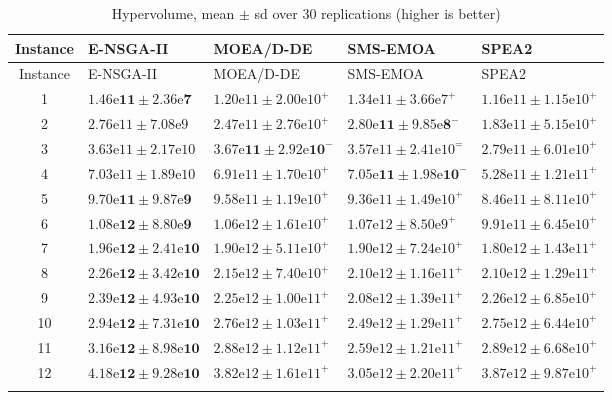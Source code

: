 \documentclass[11pt, a4paper]{article}
\begin{document}
{\small
\begin{longtable}[!htb]{@{}cllll@{}}
\caption{Hypervolume, mean $\pm$ sd over 30 replications (higher is better)}\tabularnewline
\toprule
Instance & E-NSGA-II & MOEA/D-DE & SMS-EMOA & SPEA2\tabularnewline
\midrule
\endfirsthead
\toprule
Instance & E-NSGA-II & MOEA/D-DE & SMS-EMOA & SPEA2\tabularnewline
\midrule
\endhead
1 & $\mathbf{1.46\mathrm{e}11 \pm 2.36\mathrm{e}7}$ & $1.20\mathrm{e}11 \pm 2.00\mathrm{e}10^+$ & $1.34\mathrm{e}11 \pm 3.66\mathrm{e}7^+$ & $1.16\mathrm{e}11 \pm 1.15\mathrm{e}10^+$\tabularnewline

2 & $2.76\mathrm{e}11 \pm 7.08\mathrm{e}9$ & $2.47\mathrm{e}11 \pm 2.76\mathrm{e}10^+$ & $\mathbf{2.80\mathrm{e}11 \pm 9.85\mathrm{e}8}^{-}$ & $1.83\mathrm{e}11 \pm 5.15\mathrm{e}10^+$\tabularnewline

3 & $3.63\mathrm{e}11 \pm 2.17\mathrm{e}10$ & $\mathbf{3.67\mathrm{e}11 \pm 2.92\mathrm{e}10}^-$ & $3.57\mathrm{e}11 \pm 2.41\mathrm{e}10^{=}$ & $2.79\mathrm{e}11 \pm 6.01\mathrm{e}10^+$\tabularnewline

4 & $7.03\mathrm{e}11 \pm 1.89\mathrm{e}10$ & $6.91\mathrm{e}11 \pm 1.70\mathrm{e}10^+$ & $\mathbf{7.05\mathrm{e}11 \pm 1.98\mathrm{e}10}^{-}$ & $5.28\mathrm{e}11 \pm 1.21\mathrm{e}11^+$\tabularnewline

5 & $\mathbf{9.70\mathrm{e}11 \pm 9.87\mathrm{e}9}$ & $9.58\mathrm{e}11 \pm 1.19\mathrm{e}10^+$ & $9.36\mathrm{e}11 \pm 1.49\mathrm{e}10^{+}$ & $8.46\mathrm{e}11 \pm 8.11\mathrm{e}10^+$\tabularnewline

6 & $\mathbf{1.08\mathrm{e}12 \pm 8.80\mathrm{e}9}$ & $1.06\mathrm{e}12 \pm 1.61\mathrm{e}10^+$ & $1.07\mathrm{e}12 \pm 8.50\mathrm{e}9^{+}$ & $9.91\mathrm{e}11 \pm 6.45\mathrm{e}10^+$\tabularnewline

7 & $\mathbf{1.96\mathrm{e}12 \pm 2.41\mathrm{e}10}$ & $1.90\mathrm{e}12 \pm 5.11\mathrm{e}10^+$ & $1.90\mathrm{e}12 \pm 7.24\mathrm{e}10^{+}$ & $1.80\mathrm{e}12 \pm 1.43\mathrm{e}11^+$\tabularnewline

8 & $\mathbf{2.26\mathrm{e}12 \pm 3.42\mathrm{e}10}$ & $2.15\mathrm{e}12 \pm 7.40\mathrm{e}10^+$ & $2.10\mathrm{e}12 \pm 1.16\mathrm{e}11^{+}$ & $2.10\mathrm{e}12 \pm 1.29\mathrm{e}11^+$\tabularnewline

9 & $\mathbf{2.39\mathrm{e}12 \pm 4.93\mathrm{e}10}$ & $2.25\mathrm{e}12 \pm 1.00\mathrm{e}11^+$ & $2.08\mathrm{e}12 \pm 1.39\mathrm{e}11^{+}$ & $2.26\mathrm{e}12 \pm 6.85\mathrm{e}10^+$\tabularnewline

10 & $\mathbf{2.94\mathrm{e}12 \pm 7.31\mathrm{e}10}$ & $2.76\mathrm{e}12 \pm 1.03\mathrm{e}11^+$ & $2.49\mathrm{e}12 \pm 1.29\mathrm{e}11^{+}$ & $2.75\mathrm{e}12 \pm 6.44\mathrm{e}10^+$\tabularnewline

11 & $\mathbf{3.16\mathrm{e}12 \pm 8.98\mathrm{e}10}$ & $2.88\mathrm{e}12 \pm 1.12\mathrm{e}11^+$ & $2.59\mathrm{e}12 \pm 1.21\mathrm{e}11^{+}$ & $2.89\mathrm{e}12 \pm 6.68\mathrm{e}10^+$\tabularnewline

12 & $\mathbf{4.18\mathrm{e}12 \pm 9.28\mathrm{e}10}$ & $3.82\mathrm{e}12 \pm 1.61\mathrm{e}11^+$ & $3.05\mathrm{e}12 \pm 2.20\mathrm{e}11^{+}$ & $3.87\mathrm{e}12 \pm 9.87\mathrm{e}10^+$\tabularnewline
\bottomrule
\label{tab:HV}
\end{longtable}}
\protect\hypertarget{tab:HV}{}{}
\end{document}
